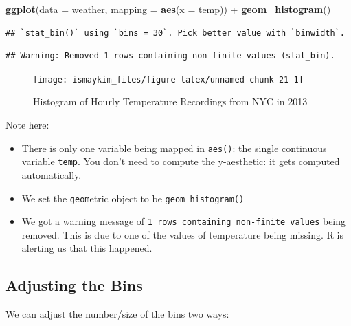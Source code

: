 \documentclass[]{tufte-book}
\newenvironment{Shaded}{\begin{snugshade}}{\end{snugshade}}
\newcommand{\KeywordTok}[1]{\textcolor[rgb]{0.13,0.29,0.53}{\textbf{{#1}}}}
\newcommand{\DataTypeTok}[1]{\textcolor[rgb]{0.13,0.29,0.53}{{#1}}}
\newcommand{\StringTok}[1]{\textcolor[rgb]{0.31,0.60,0.02}{{#1}}}
\newcommand{\NormalTok}[1]{{#1}}
\providecommand{\tightlist}{%
  \setlength{\itemsep}{0pt}\setlength{\parskip}{0pt}}
\theoremstyle{definition}
\theoremstyle{definition}
\theoremstyle{remark}
\begin{document}
\begin{Shaded}
\begin{Highlighting}[]
\KeywordTok{ggplot}\NormalTok{(}\DataTypeTok{data =} \NormalTok{weather, }\DataTypeTok{mapping =} \KeywordTok{aes}\NormalTok{(}\DataTypeTok{x =} \NormalTok{temp)) +}
\StringTok{  }\KeywordTok{geom_histogram}\NormalTok{()}
\end{Highlighting}
\end{Shaded}

\begin{verbatim}
## `stat_bin()` using `bins = 30`. Pick better value with `binwidth`.
\end{verbatim}

\begin{verbatim}
## Warning: Removed 1 rows containing non-finite values (stat_bin).
\end{verbatim}

\begin{figure}

{\centering \texttt{[image: ismaykim\_files/figure-latex/unnamed-chunk-21-1]} 

}

\caption[Histogram of Hourly Temperature Recordings from NYC in 2013]{Histogram of Hourly Temperature Recordings from NYC in 2013}\label{fig:unnamed-chunk-21}
\end{figure}

Note here:

\begin{itemize}
\tightlist
\item
  There is only one variable being mapped in \texttt{aes()}: the single
  continuous variable \texttt{temp}. You don't need to compute the
  y-aesthetic: it gets computed automatically.
\item
  We set the \texttt{geom}etric object to be \texttt{geom\_histogram()}
\item
  We got a warning message of
  \texttt{1\ rows\ containing\ non-finite\ values} being removed. This
  is due to one of the values of temperature being missing. R is
  alerting us that this happened.
\end{itemize}

\subsection{Adjusting the Bins}\label{adjustbins}

We can adjust the number/size of the bins two ways:
\end{document}

